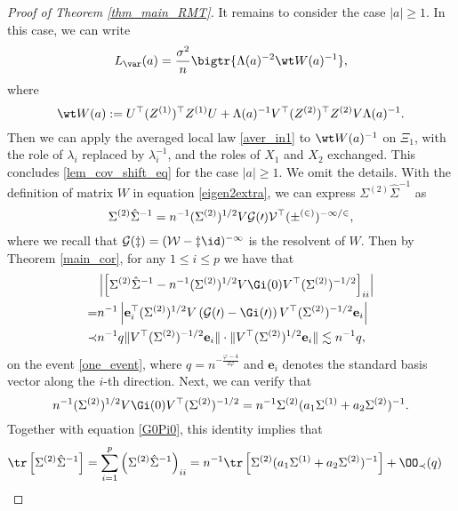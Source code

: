 \documentclass[aos,preprint]{imsart}
\begin{document}
\begin{proof}[Proof of Theorem \ref{thm_main_RMT}]
It remains to consider the case $|a|\ge 1$. In this case, we can write
$$L_{\var}(a)= \frac{\sigma^2}{n} \bigtr{\Lambda(a)^{-2} \wt W(a)^{-1} },$$
where
$$ \wt W(a):= U^\top (Z^{(1)})^\top Z^{(1)} U  +\Lambda(a) ^{-1} V^\top (Z^{(2)})^\top Z^{(2)}V\Lambda(a) ^{-1}.$$
Then we can apply the averaged local law \eqref{aver_in1} to $ \wt W(a)^{-1}$ on $\Xi_1$, with the role of $\lambda_i$ replaced by $\lambda_i^{-1}$, and the roles of $X_1$ and $X_2$ exchanged. This concludes \eqref{lem_cov_shift_eq} for the case $|a|\ge 1$. We omit the details.
\iffalse
With the definition of matrix $W$ in equation \eqref{eigen2extra}, we can express $\Sigma^{(2)}\hat \Sigma^{-1}$ as
$$\Sigma^{(2)}\hat \Sigma^{-1} = n^{-1} ({\Sigma^{(2)}})^{1/2} V \cal G(0) V^{\top} ({\Sigma^{(2)}})^{-1/2},$$
where we recall that $\cal G(z)=(W-z\id )^{-1}$ is the resolvent of $W$.
Then by Theorem \ref{main_cor}, for any $1\le i \le p$ we have that
\begin{align}
& \left| \left[\Sigma^{(2)}\hat \Sigma^{-1} - n^{-1} (\Sigma^{(2)})^{1/2}V \Gi(0)V^\top(\Sigma^{(2)})^{-1/2} \right]_{ii}\right|  \nonumber\\
 = & n^{-1} \left|\mathbf e_i^\top (\Sigma^{(2)})^{1/2}V \left(\cal G(0)-\Gi(0)\right)V^\top (\Sigma^{(2)})^{-1/2} \mathbf e_i\right| \nonumber\\
\prec & n^{-1}q\|V^\top (\Sigma^{(2)})^{-1/2} \mathbf e_i\|\cdot \|V^\top (\Sigma^{(2)})^{1/2} \mathbf e_i\|   \lesssim n^{-1}q ,\label{G0Pi0}
\end{align}
on the event \eqref{one_event}, %
where $ q= n^{-\frac{\varphi - 4}{2\varphi}}$ and $\mathbf e_i$ denotes the standard basis vector along the $i$-th direction.
Next, we can verify that %
$$ n^{-1}  (\Sigma^{(2)})^{1/2}V \Gi(0)V^\top (\Sigma^{(2)})^{-1/2} = n^{-1}  \Sigma^{(2)}(a_1 \Sigma^{(1)}+  a_2\Sigma^{(2)})^{-1} .$$
Together with equation \eqref{G0Pi0}, this identity implies that %
\begin{align*}
 \tr \left[\Sigma^{(2)}\hat \Sigma^{-1} \right]& = \sum_{i=1}^p\left(\Sigma^{(2)}\hat \Sigma^{-1} \right)_{ii} = n^{-1}\tr \left[ \Sigma^{(2)}(a_1 \Sigma^{(1)}+  a_2\Sigma^{(2)})^{-1} \right] +\OO_\prec(q  ) 

\end{align*}
\end{proof}
\end{document}
